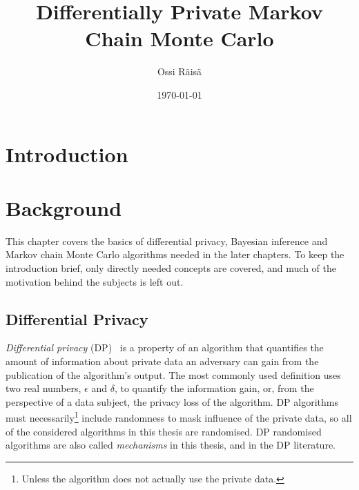 \documentclass[english,twoside,openright]{HYgraduMLDS}
\title{Differentially Private Markov Chain Monte Carlo}
\author{Ossi Räisä}
\date{\today}
\begin{document}
\maketitle


\begin{abstract}
 
\end{abstract}

\mytableofcontents

\mynomenclature

\chapter{Introduction}

\chapter{Background}

This chapter covers the basics of differential privacy, Bayesian inference
and Markov chain Monte Carlo algorithms needed in the later chapters. To keep
the introduction brief, only directly needed concepts are covered, and much
of the motivation behind the subjects is left out.

\section{Differential Privacy}\label{DP_background}
\emph{Differential privacy} (DP)~\cite{DMN06, DwR14} is a property of
an algorithm that quantifies the
amount of information about private data an adversary can gain from the 
publication of the algorithm's output.
The most commonly used definition uses two real numbers, 
\(\epsilon\) and \(\delta\), to quantify the information gain, or, from the 
perspective of a data subject, the privacy loss of the algorithm.
DP algorithms must necessarily\footnote{Unless the algorithm does not
actually use the private data.} include randomness to mask influence of the
private data, so all of the considered algorithms in this thesis are randomised.
DP randomised algorithms are also called \emph{mechanisms} in this thesis, and in the
DP literature.
\end{document}
